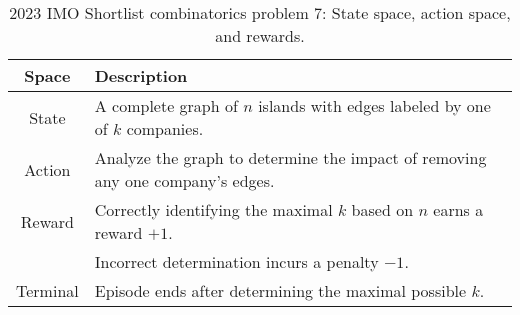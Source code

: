 \begin{table}[htb]
\caption{2023 IMO Shortlist combinatorics problem 7: State space, action space, and rewards.}
  \centering
  \small
\begin{tabular}{cl}
  \toprule
Space & Description \\
\midrule
State    & A complete graph of \( n \) islands with edges labeled by one of \( k \) companies. \\
Action   & Analyze the graph to determine the impact of removing any one company's edges. \\
Reward   & Correctly identifying the maximal \( k \) based on \( n \) earns a reward \( +1 \). \\
         & Incorrect determination incurs a penalty \( -1 \). \\
Terminal & Episode ends after determining the maximal possible \( k \). \\
\bottomrule
\end{tabular}
\end{table}

